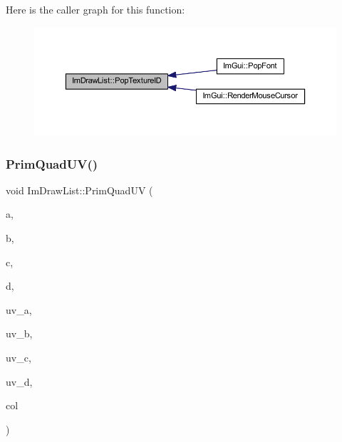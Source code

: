 Here is the caller graph for this function\+:
\nopagebreak
\begin{figure}[H]
\begin{center}
\leavevmode
\includegraphics[width=350pt]{struct_im_draw_list_ade9286c5ca58753f7bd571b30e2ff76c_icgraph}
\end{center}
\end{figure}
\mbox{\label{struct_im_draw_list_a9df27414aaca5f34ac3664a8b82582b5}} 
\subsubsection{\texorpdfstring{Prim\+Quad\+U\+V()}{PrimQuadUV()}}
{\footnotesize\ttfamily void Im\+Draw\+List\+::\+Prim\+Quad\+UV (\begin{DoxyParamCaption}\item[{const \mbox{\hyperlink{struct_im_vec2}{Im\+Vec2}} \&}]{a,  }\item[{const \mbox{\hyperlink{struct_im_vec2}{Im\+Vec2}} \&}]{b,  }\item[{const \mbox{\hyperlink{struct_im_vec2}{Im\+Vec2}} \&}]{c,  }\item[{const \mbox{\hyperlink{struct_im_vec2}{Im\+Vec2}} \&}]{d,  }\item[{const \mbox{\hyperlink{struct_im_vec2}{Im\+Vec2}} \&}]{uv\+\_\+a,  }\item[{const \mbox{\hyperlink{struct_im_vec2}{Im\+Vec2}} \&}]{uv\+\_\+b,  }\item[{const \mbox{\hyperlink{struct_im_vec2}{Im\+Vec2}} \&}]{uv\+\_\+c,  }\item[{const \mbox{\hyperlink{struct_im_vec2}{Im\+Vec2}} \&}]{uv\+\_\+d,  }\item[{\mbox{\hyperlink{imgui_8h_a118cff4eeb8d00e7d07ce3d6460eed36}{Im\+U32}}}]{col }\end{DoxyParamCaption})}

\mbox{\label{struct_im_draw_list_ae2be093563f1d20b8190b7c423113925}} 
